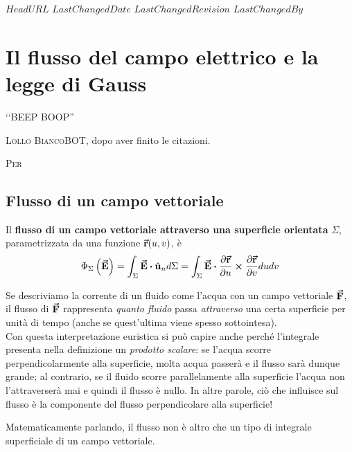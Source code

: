 \svnidlong
{$HeadURL$}
{$LastChangedDate$}
{$LastChangedRevision$}
{$LastChangedBy$}

\chapter{Il flusso del campo elettrico e la legge di Gauss}

\begin{introduction}
	‘‘BEEP BOOP''
	\begin{flushright}
		\textsc{Lollo BiancoBOT}, dopo aver finito le citazioni. %
	\end{flushright}
\end{introduction}
\lettrine[findent=1pt, nindent=0pt]{P}{er}  %
\section{Flusso di un campo vettoriale}
\begin{define}
	Il \textbf{flusso di un campo vettoriale attraverso una superficie orientata} $\Sigma$, parametrizzata da una funzione $\vb*{\va{r}}(u,v)$, è
	\begin{equation}
		\Phi_{\Sigma}\left(\vba{E}\right)=\int_{\Sigma}\vba{E}\vdot\vbh{u}_nd\Sigma=\int_{\Sigma}\vba{E}\vdot\frac{\partial \vba{r}}{\partial u}\cross\frac{\partial \vba{r}}{\partial v}dudv
	\end{equation}
\end{define}
\begin{intuit}
	Se descriviamo la corrente di un fluido come l'acqua con un campo vettoriale $\vb*{\va{F}}$, il flusso di $\vb*{\va{F}}$ rappresenta \textit{quanto fluido} passa \textit{attraverso} una certa superficie per unità di tempo (anche se quest'ultima viene spesso sottointesa).\\
	Con questa interpretazione euristica si può capire anche perché l'integrale presenta nella definizione un \textit{prodotto scalare}: se l'acqua scorre perpendicolarmente alla superficie, molta acqua passerà e il flusso sarà dunque grande; al contrario, se il fluido scorre parallelamente alla superficie l'acqua non l'attraverserà mai e quindi il flusso è nullo. In altre parole, ciò che influisce sul flusso è la componente del flusso perpendicolare alla superficie!
\end{intuit}
Matematicamente parlando, il flusso non è altro che un tipo di integrale superficiale di un campo vettoriale. %

